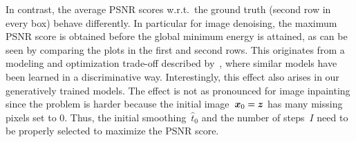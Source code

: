 \documentclass{article}
\def\hatt{{\widehat{t}}}
\theoremstyle{plain}
\theoremstyle{definition}
\theoremstyle{remark}
\begin{document}
In contrast, the average PSNR scores w.r.t.~the ground truth (second row in every box) behave differently.
In particular for image denoising, the maximum PSNR score is obtained before the global minimum energy is attained, as can be seen by comparing the plots in the first and second rows.
This originates from a modeling and optimization trade-off described by~\citet{EfKo20}, where similar models have been learned in a discriminative way.
Interestingly, this effect also arises in our generatively trained models.
The effect is not as pronounced for image inpainting since the problem is harder because the initial image~${\bm{x}}_0={\bm{z}}$ has many missing pixels set to $0$.
Thus, the initial smoothing~$\hatt_0$ and the number of steps~$I$ need to be properly selected to maximize the PSNR score.
\begin{figure}[h!]
\centering
{}
\end{figure}
\end{document}
